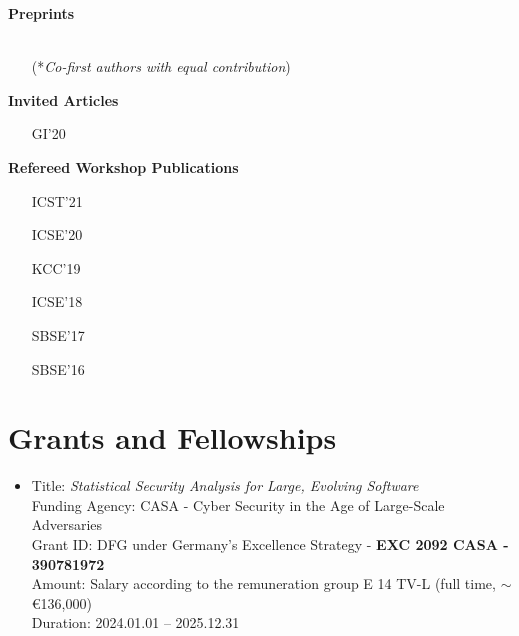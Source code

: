 \documentclass[letterpaper,11pt]{article}
\begin{document}

\textbf{Preprints}\vspace{-4pt}
\begin{itemize}[leftmargin=2cm]
  \item[] \\ (*\emph{Co-first authors with equal contribution})
  \item[] 
\end{itemize}

\textbf{Invited Articles}\vspace{-4pt}
\begin{itemize}[leftmargin=2cm]
  \item[GI'20] 
\end{itemize}

\textbf{Refereed Workshop Publications}\vspace{-4pt}
\begin{itemize}[leftmargin=2cm]
  \item[ICST'21] 
  \item[ICSE'20] 
  \item[KCC'19] 
  \item[ICSE'18] 
  \item[SBSE'17] 
  \item[SBSE'16] 
\end{itemize}

\section{Grants and Fellowships}
\begin{itemize}
  \item Title: \emph{Statistical Security Analysis for Large, Evolving Software} \\
        Funding Agency: CASA - Cyber Security in the Age of Large-Scale Adversaries \\
        Grant ID: DFG under Germany's Excellence Strategy - \textbf{EXC 2092 CASA - 390781972} \\
        Amount: Salary according to the remuneration group E 14 TV-L (full time, $\sim$ \euro{136,000}) \\
        Duration: 2024.01.01 -- 2025.12.31
\end{itemize}
\end{document}
